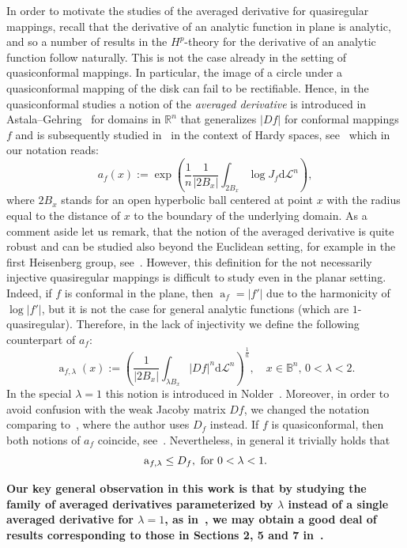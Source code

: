\documentclass[11pt,a4paper,reqno]{amsart}
\theoremstyle{definition}
\renewcommand{\a}{\operatorname{a}}
\newcommand{\B}{\mathbb{B}^n}
\newcommand{\R}{\mathbb{R}}
\newcommand{\Leb}{\mathrm {d}{\mathcal L}^{n}}
\numberwithin{komcounter}{section}
\begin{document}
In order to motivate the studies of the averaged derivative for quasiregular mappings, recall that the derivative of an analytic function in plane is analytic, and so a number of results in the $H^p$-theory for the derivative of an analytic function follow naturally. This is not the case already in the setting of quasiconformal mappings. In particular, the image of a circle under a quasiconformal mapping of the disk can fail to be rectifiable. Hence, in the quasiconformal studies a notion of the \emph{averaged derivative} is introduced in Astala--Gehring~\cite{asge2} for domains in $\R^n$ that generalizes $|Df|$ for conformal mappings $f$ and is subsequently studied in~\cite{ak} in the context of Hardy spaces, see~\cite[Formula (1.5)]{asge1} which in our notation reads:
\begin{equation}\label{AG-af}
a_f(x) := \exp \left(\frac{1}{n}\frac{1}{|2B_x|}\int_{2B_x} \log J_f \Leb\right),
\end{equation}
where $2B_x$ stands for an open hyperbolic ball centered at point $x$ with the radius equal to the distance of $x$ to the boundary of the underlying domain. As a comment aside let us remark, that the notion of the averaged derivative is quite robust and can be studied also beyond the Euclidean setting, for example in the first Heisenberg group, see~\cite[Definition 1.3]{afw}. However, this definition for the not necessarily injective quasiregular mappings is difficult to study even in the planar setting. Indeed, if $f$ is conformal in the plane, then $\a_f=|f'|$ due to the harmonicity of $\log |f'|$, but it is not the case for general analytic functions (which are $1$-quasiregular). Therefore, in the lack of injectivity we define the following counterpart of $a_f$:
\begin{equation}\label{eq:af}
	\a_{f,\lambda}(x):=\left(\frac{1}{|2B_x|}\int_{\lambda B_x}|Df|^n \Leb \right)^\frac{1}{n},\quad x\in \B,\,0<\lambda<2.
\end{equation}
In the special $\lambda=1$ this notion is introduced in Nolder~\cite{no}. Moreover, in order to avoid confusion with the weak Jacoby matrix $Df$, we changed the notation comparing to~\cite{no}, where the author uses $D_f$ instead. If $f$ is quasiconformal, then both notions of $a_f$ coincide, see~\cite[Lemma 2.7]{no}. Nevertheless, in general it trivially holds that
 $$
  \a_{f,\lambda}\leq D_f, \hbox{ for } 0<\lambda<1.
 $$

{\bf Our key general observation in this work is that by studying the family of averaged derivatives parameterized by $\lambda$ instead of a single averaged derivative for $\lambda=1$, as in~\cite{no}, we may obtain a good deal of results corresponding to those in Sections 2, 5 and 7 in~\cite{ak}.} 
\end{document}
